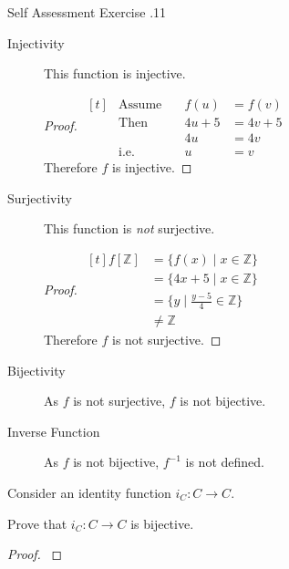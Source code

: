\documentclass[\main/notes.tex]{subfiles}
\begin{document}
\begin{exercise}{Self Assessment Exercise \thechapter.11}
\begin{questions}
\begin{questions}
\begin{answer}
									\begin{description}
										\item[Injectivity] This function is injective.
											\begin{proof}
												$ 
													\begin{aligned}[t]
														& \text{Assume} \quad &f(u) &= f(v)\\
														& \text{Then} &4u + 5 &= 4v + 5\\
														& & 4u &= 4v\\
														& \text{i.e.} & u &= v
													\end{aligned}
												$ \\
												Therefore $f$ is injective.
											\end{proof}
										\item[Surjectivity] This function is \emph{not} surjective.
											\begin{proof}
												$ 
													\begin{aligned}[t]
														f[\mathbb{Z}] &= \{f(x) \mid x \in \mathbb{Z}\}\\
														&= \{4x + 5 \mid x \in \mathbb{Z}\}\\
														&= \{y \mid \frac{y - 5}{4} \in \mathbb{Z}\}\\
														& \neq \mathbb{Z}
													\end{aligned}
												$ \\
												Therefore $f$ is not surjective.
											\end{proof}
										\item[Bijectivity] As $f$ is not surjective, $f$ is not bijective.
										\item[Inverse Function] As $f$ is not bijective, $f^{-1}$ is not defined. 
									\end{description}
								\end{answer}
						\end{questions}
					\pagebreak
					\item Consider an identity function $i_{C}: C \rightarrow C$.
						\begin{questions}
							\item Prove that $i_{C}: C \rightarrow C$ is bijective.
								\begin{answer}
									\begin{proof}
										$ $
										\begin{subproof}[Injectivity]
											$ 

\end{subproof}
\end{proof}
\end{answer}
\end{questions}
\end{questions}
\end{exercise}
\end{document}
